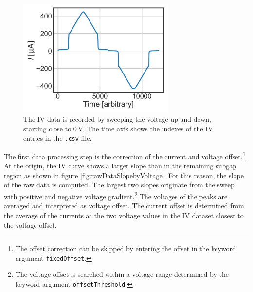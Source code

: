 \documentclass[]{article}
\begin{document}
\begin{figure}
	\centering
	\includegraphics[width=0.7\textwidth]{./../IV_Class_Unit_Test/2020_01_14/Raw_Data_by_Time.pdf}
	\caption{The IV data is recorded by sweeping the voltage up and down, starting close to 0\,V. The time axis shows the indexes of the IV entries in the \texttt{.csv} file.}
	\label{fig:rawDatabyTime}
\end{figure}

The first data processing step is the correction of the current and voltage offset.\footnote{The offset correction can be skipped by entering the offset in the keyword argument \texttt{fixedOffset}.} At the origin, the IV curve shows a larger slope than in the remaining subgap region as shown in figure \ref{fig:rawDataSlopebyVoltage}. For this reason, the slope of the raw data is computed. The largest two slopes originate from the sweep with positive and negative voltage gradient.\footnote{The voltage offset is searched within a voltage range determined by the keyword argument \texttt{offsetThreshold}.} The voltages of the peaks are averaged and interpreted as voltage offset. The current offset is determined from the average of the currents at the two voltage values in the IV dataset closest to the voltage offset.
\end{document}
